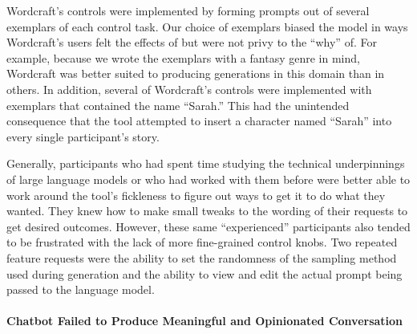 Wordcraft's controls were implemented by forming prompts out of several exemplars of each control task.
Our choice of exemplars biased the model in ways Wordcraft's users felt the effects of but were not privy to the ``why'' of.
For example, because we wrote the exemplars with a fantasy genre in mind, Wordcraft was better suited to producing generations in this domain than in others.
In addition, several of Wordcraft's controls were implemented with exemplars that contained the name ``Sarah.'' This had the unintended consequence that the tool attempted to insert a character named ``Sarah'' into every single participant's story.

Generally, participants who had spent time studying the technical underpinnings of large language models or who had worked with them before were better able to work around the tool's fickleness to figure out ways to get it to do what they wanted.
They knew how to make small tweaks to the wording of their requests to get desired outcomes.
However, these same ``experienced'' participants also tended to be frustrated with the lack of more fine-grained control knobs.
Two repeated feature requests were the ability to set the randomness of the sampling method used during generation and the ability to view and edit the actual prompt being passed to the language model.


\paragraph{Chatbot Failed to Produce Meaningful and Opinionated Conversation}

